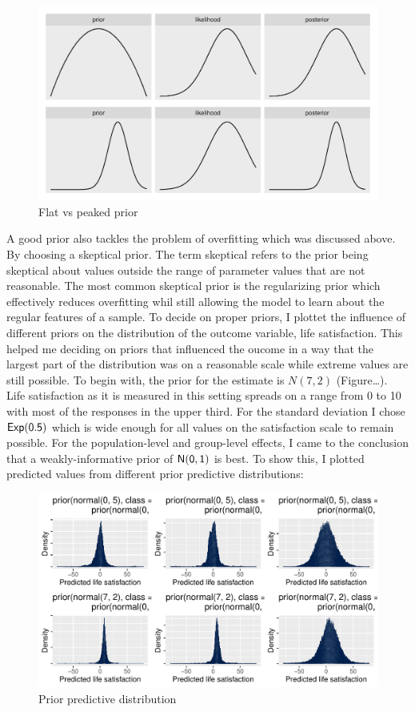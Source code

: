 \documentclass[a4, 12pt]{article}
\begin{document}
\begin{figure}

{\centering \includegraphics[width=0.8\linewidth]{../figures/flat_peaked} 

}

\caption{Flat vs peaked prior}\label{fig:flat-peaked}
\end{figure}

A good prior also tackles the problem of overfitting which was discussed above. By choosing a skeptical prior. The term skeptical refers to the prior being skeptical about values outside the range of parameter values that are not reasonable. The most common skeptical prior is the regularizing prior which effectively reduces overfitting whil still allowing the model to learn about the regular features of a sample.
To decide on proper priors, I plottet the influence of different priors on the distribution of the outcome variable, life satisfaction. This helped me deciding on priors that influenced the oucome in a way that the largest part of the distribution was on a reasonable scale while extreme values are still possible. To begin with, the prior for the estimate is \(N(7,2)\) (Figure\ldots). Life satisfaction as it is measured in this setting spreads on a range from 0 to 10 with most of the responses in the upper third. For the standard deviation I chose \(\sf {Exp}(0.5)\) which is wide enough for all values on the satisfaction scale to remain possible. For the population-level and group-level effects, I came to the conclusion that a weakly-informative prior of \(\sf {N}(0,1)\) is best. To show this, I plotted predicted values from different prior predictive distributions:

\begin{figure}

{\centering \includegraphics[width=0.8\linewidth]{../figures/lsat_predicted} 

}

\caption{Prior predictive distribution}\label{fig:lsat-predicted}
\end{figure}
\end{document}
